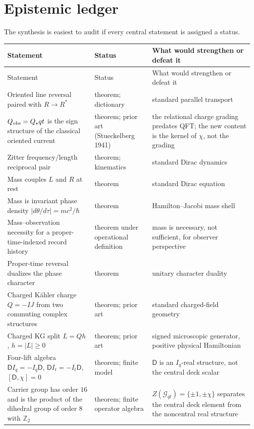 \documentclass[11pt]{article}
\theoremstyle{definition}\newtheorem{definition}[theorem]{Definition}
\theoremstyle{remark}\newtheorem{remark}[theorem]{Remark}\newtheorem{conjecture}[theorem]{Conjecture}
\begin{document}
\section{Epistemic ledger}\label{sec:ledger}
The synthesis is easiest to audit if every central statement is assigned a status.
\begin{longtable}{>{\raggedright\arraybackslash}p{} >{\raggedright\arraybackslash}p{} >{\raggedright\arraybackslash}p{}}
\toprule
Statement & Status & What would strengthen or defeat it\\
\midrule
\endfirsthead
\toprule
Statement & Status & What would strengthen or defeat it\\
\midrule
\endhead
Oriented line reversal paired with $R\to R^*$ & theorem; dictionary & standard parallel transport\\
$Q_{\rm obs}=Q_\star qt$ is the sign structure of the classical oriented current & theorem; prior art (Stueckelberg 1941) & the relational charge grading predates QFT; the new content is the kernel of $\chi$, not the grading\\
Zitter frequency/length reciprocal pair & theorem; kinematics & standard Dirac dynamics\\
Mass couples $L$ and $R$ at rest & theorem & standard Dirac equation\\
Mass is invariant phase density $|d\theta/d\tau|=mc^2/\hbar$ & theorem & Hamilton--Jacobi mass shell\\
Mass--observation necessity for a proper-time-indexed record history & theorem under operational definition & mass is necessary, not sufficient, for observer perspective\\
Proper-time reversal dualizes the phase character & theorem & unitary character duality\\
Charged K\"ahler charge $Q=-IJ$ from two commuting complex structures & theorem; prior art & standard charged-field geometry\\
Charged KG split $L=Qh$, $h=|L|\ge0$ & theorem; prior art & signed microscopic generator, positive physical Hamiltonian\\
Four-lift algebra $\mathsf D I_q=-I_q\mathsf D$, $\mathsf D I_t=-I_t\mathsf D$, $[\mathsf D,\chi]=0$ & theorem; finite model & $\mathsf D$ is an $I_q$-real structure, not the central deck scalar\\
Carrier group has order $16$ and is the product of the dihedral group of order $8$ with $\mathbb Z_2$ & theorem; finite operator algebra & $Z(\mathcal G_{qt})=\{\pm1,\pm\chi\}$ separates the central deck element from the noncentral real structure\\

\end{longtable}
\end{document}

